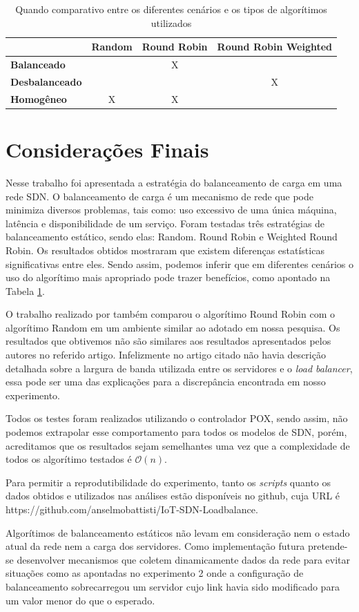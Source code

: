 \documentclass[12pt]{article}
\begin{document}
\begin{table}[]
\centering
\caption{Quando comparativo entre os diferentes cenários e os tipos de algorítimos utilizados}
\label{quadro_comparativo}
\begin{tabular}{lccc}
 & \multicolumn{1}{l}{\textbf{Random}} & \multicolumn{1}{l}{\textbf{Round Robin}} & \multicolumn{1}{l}{\textbf{Round Robin Weighted}} \\\hline
\textbf{Balanceado} &  & X &  \\
\textbf{Desbalanceado} &  &  & X \\
\textbf{Homogêneo} & X & X & 
\end{tabular}
\end{table}

\section{Considerações Finais}

Nesse trabalho foi apresentada a estratégia do balanceamento de carga em uma rede SDN. O balanceamento de carga é um mecanismo de rede que pode minimiza diversos problemas, tais como: uso excessivo de uma única máquina, latência e disponibilidade de um serviço. Foram testadas três estratégias de balanceamento estático, sendo elas: Random. Round Robin e Weighted Round Robin. Os resultados obtidos mostraram que existem diferenças estatísticas significativas entre eles. Sendo assim, podemos inferir que em diferentes cenários o uso do algorítimo mais apropriado pode trazer benefícios, como apontado na Tabela \ref{quadro_comparativo}.

O trabalho realizado por \cite{Kaur2015} também comparou o algorítimo Round Robin com o algorítimo Random em um ambiente similar ao adotado em nossa pesquisa. Os resultados que obtivemos não são similares aos resultados apresentados pelos autores no referido artigo. Infelizmente no artigo citado não havia descrição detalhada sobre a largura de banda utilizada entre os servidores e o \textit{load balancer}, essa pode ser uma das explicações para a discrepância encontrada em nosso experimento.

Todos os testes foram realizados utilizando o controlador POX, sendo assim, não podemos extrapolar esse comportamento para todos os modelos de SDN, porém, acreditamos que os resultados sejam semelhantes uma vez que a complexidade de todos os algorítimo testados é $\mathcal{O}(n)$.

Para permitir a reprodutibilidade do experimento, tanto os \textit{scripts} quanto os dados obtidos e utilizados nas análises estão disponíveis no github, cuja URL é https://github.com/anselmobattisti/IoT-SDN-Loadbalance.

Algorítimos de balanceamento estáticos não levam em consideração nem o estado atual da rede nem a carga dos servidores. Como implementação futura pretende-se desenvolver mecanismos que coletem dinamicamente dados da rede para evitar situações como as apontadas no experimento 2 onde a configuração de balanceamento sobrecarregou um servidor cujo link havia sido modificado para um valor menor do que o esperado.



\end{document}
